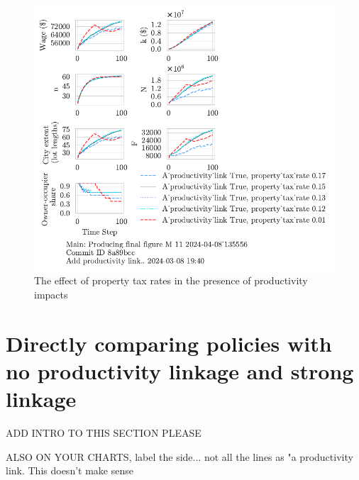 {%
\begin{figure}[h!tb] 
    \centering
    \includegraphics[scale=1, trim={0 1.4cm 0 0},clip]{fig/link-property_tax_135556.pdf}  %
    \caption{The effect of property tax rates in the presence of productivity impacts}
    \label{fig:Productivity_link_and_property_tax_ownership_trajectory}
\end{figure}


\newpage
\section{Directly comparing policies with no productivity linkage and  strong linkage }

{\color{red} ADD INTRO TO THIS SECTION PLEASE

ALSO ON YOUR CHARTS, label the side... not all the lines as "a productivity link. This doesn't make sense}

}
